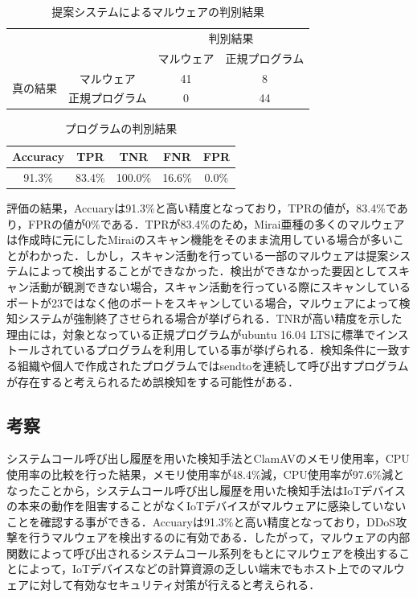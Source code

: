\begin{table}[h]
    \centering
    \caption{提案システムによるマルウェアの判別結果}
    \label{tab:detect}
    \begin{tabular}{cc|c|c|}
    \cline{3-4}
    & \multicolumn{1}{l|}{} & \multicolumn{2}{c|}{判別結果} \\ \cline{3-4} 
    &                       & マルウェア      & 正規プログラム      \\ \hline
    \multicolumn{1}{|c|}{\multirow{2}{*}{真の結果}} & マルウェア                 & 41         & 8            \\ \cline{2-4} 
    \multicolumn{1}{|c|}{}                      & 正規プログラム               & 0          & 44           \\ \hline
    \end{tabular}
    \end{table}

\begin{table}[h]
     \caption{プログラムの判別結果} 
     \label{tab:result}
     \centering 
    \begin{tabular}{|c|c|c|c|c|} \hline 
    Accuracy & TPR    & TNR     & FNR    & FPR   \\ \hline
    91.3\%   & 83.4\% & 100.0\% & 16.6\% & 0.0\% \\ \hline
    \end{tabular}
\end{table}

評価の結果，Accuaryは91.3\%と高い精度となっており，TPRの値が，83.4\%であり，FPRの値が0\%である．TPRが83.4\%のため，Mirai亜種の多くのマルウェアは作成時に元にしたMiraiのスキャン機能をそのまま流用している場合が多いことがわかった．しかし，スキャン活動を行っている一部のマルウェアは提案システムによって検出することができなかった．検出ができなかった要因としてスキャン活動が観測できない場合，スキャン活動を行っている際にスキャンしているポートが23ではなく他のポートをスキャンしている場合，マルウェアによって検知システムが強制終了させられる場合が挙げられる．TNRが高い精度を示した理由には，対象となっている正規プログラムがubuntu 16.04 LTSに標準でインストールされているプログラムを利用している事が挙げられる．検知条件に一致する組織や個人で作成されたプログラムではsendtoを連続して呼び出すプログラムが存在すると考えられるため誤検知をする可能性がある．

\subsection{考察}
システムコール呼び出し履歴を用いた検知手法とClamAVのメモリ使用率，CPU使用率の比較を行った結果，メモリ使用率が48.4\%減，CPU使用率が97.6\%減となったことから，システムコール呼び出し履歴を用いた検知手法はIoTデバイスの本来の動作を阻害することがなくIoTデバイスがマルウェアに感染していないことを確認する事ができる．Accuaryは91.3\%と高い精度となっており，DDoS攻撃を行うマルウェアを検出するのに有効である．したがって，マルウェアの内部関数によって呼び出されるシステムコール系列をもとにマルウェアを検出することによって，IoTデバイスなどの計算資源の乏しい端末でもホスト上でのマルウェアに対して有効なセキュリティ対策が行えると考えられる．